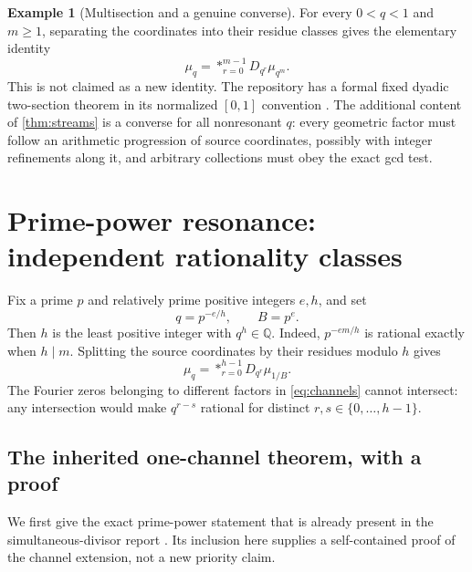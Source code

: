 \documentclass[11pt,letterpaper]{article}
\theoremstyle{definition}
\newtheorem{example}[theorem]{Example}
\theoremstyle{remark}
\newcommand{\Q}{\mathbb Q}
\numberwithin{equation}{section}
\begin{document}
\begin{example}[Multisection and a genuine converse]
For every $0<q<1$ and $m\ge1$, separating the coordinates into their residue classes gives the elementary identity
\begin{equation}\label{eq:multisection}
 \mu_q=\mathop{*}_{r=0}^{m-1}D_{q^r}\mu_{q^m}.
\end{equation}
This is not claimed as a new identity. The repository has a formal fixed dyadic two-section theorem in its normalized $[0,1]$ convention \cite{repo-multisection}. The additional content of \cref{thm:streams} is a converse for all nonresonant $q$: every geometric factor must follow an arithmetic progression of source coordinates, possibly with integer refinements along it, and arbitrary collections must obey the exact gcd test.
\end{example}

\section{Prime-power resonance: independent rationality classes}\label{sec:resonance}
Fix a prime $p$ and relatively prime positive integers $e,h$, and set
\begin{equation}\label{eq:resonance}
 q=p^{-e/h},\qquad B=p^e.
\end{equation}
Then $h$ is the least positive integer with $q^h\in\Q$. Indeed, $p^{-em/h}$ is rational exactly when $h\mid m$. Splitting the source coordinates by their residues modulo $h$ gives
\begin{equation}\label{eq:channels}
 \mu_q=\mathop{*}_{r=0}^{h-1}D_{q^r}\mu_{1/B}.
\end{equation}
The Fourier zeros belonging to different factors in \eqref{eq:channels} cannot intersect: any intersection would make $q^{r-s}$ rational for distinct $r,s\in\{0,\ldots,h-1\}$.

\subsection{The inherited one-channel theorem, with a proof}
We first give the exact prime-power statement that is already present in the simultaneous-divisor report \cite{repo-hall}. Its inclusion here supplies a self-contained proof of the channel extension, not a new priority claim.
\end{document}
